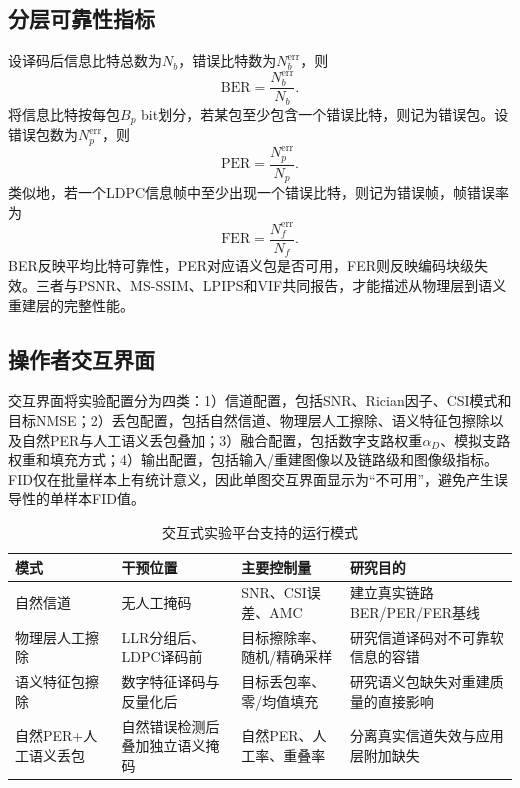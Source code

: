 \documentclass[conference]{IEEEtran}
\begin{document}
\subsection{分层可靠性指标}
设译码后信息比特总数为$N_b$，错误比特数为$N_b^{\mathrm{err}}$，则
\begin{equation}
    \mathrm{BER}=\frac{N_b^{\mathrm{err}}}{N_b}.
    \label{eq:ber}
\end{equation}
将信息比特按每包$B_p$ bit划分，若某包至少包含一个错误比特，则记为错误包。设错误包数为$N_p^{\mathrm{err}}$，则
\begin{equation}
    \mathrm{PER}=\frac{N_p^{\mathrm{err}}}{N_p}.
    \label{eq:per}
\end{equation}
类似地，若一个LDPC信息帧中至少出现一个错误比特，则记为错误帧，帧错误率为
\begin{equation}
    \mathrm{FER}=\frac{N_f^{\mathrm{err}}}{N_f}.
    \label{eq:fer}
\end{equation}
BER反映平均比特可靠性，PER对应语义包是否可用，FER则反映编码块级失效。三者与PSNR、MS-SSIM、LPIPS和VIF共同报告，才能描述从物理层到语义重建层的完整性能。

\subsection{操作者交互界面}
交互界面将实验配置分为四类：1）信道配置，包括SNR、Rician因子、CSI模式和目标NMSE；2）丢包配置，包括自然信道、物理层人工擦除、语义特征包擦除以及自然PER与人工语义丢包叠加；3）融合配置，包括数字支路权重$\alpha_D$、模拟支路权重和填充方式；4）输出配置，包括输入/重建图像以及链路级和图像级指标。FID仅在批量样本上有统计意义，因此单图交互界面显示为“不可用”，避免产生误导性的单样本FID值。

\begin{table}[t]
\centering
\caption{交互式实验平台支持的运行模式}
\label{tab:modes}
\begin{tabular}{p{} p{} p{} p{}}
\toprule
模式 & 干预位置 & 主要控制量 & 研究目的 \\
\midrule
自然信道 & 无人工掩码 & SNR、CSI误差、AMC & 建立真实链路BER/PER/FER基线 \\
物理层人工擦除 & LLR分组后、LDPC译码前 & 目标擦除率、随机/精确采样 & 研究信道译码对不可靠软信息的容错 \\
语义特征包擦除 & 数字特征译码与反量化后 & 目标丢包率、零/均值填充 & 研究语义包缺失对重建质量的直接影响 \\
自然PER+人工语义丢包 & 自然错误检测后叠加独立语义掩码 & 自然PER、人工率、重叠率 & 分离真实信道失效与应用层附加缺失 \\
\bottomrule
\end{tabular}
\end{table}
\end{document}
